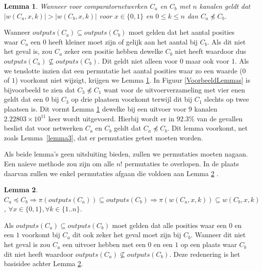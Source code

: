 \documentclass{article}
\newtheorem{lemma}{Lemma}
\begin{document}
\begin{lemma}
	Wanneer voor comparatornetwerken $C_a$ en $C_b$ met $n$ kanalen geldt dat $|w\left(C_a, x, k\right)| > |w\left(C_b, x, k\right)|$ voor $x \in \{0,1\}$ en $0 \leq k \leq n$ dan $C_a \npreceq C_b$.
	\label{lemma4}
\end{lemma}
Wanneer ${outputs(C_a) \subseteq outputs(C_b)}$ moet gelden dat het aantal posities waar $C_a$ een $0$ heeft kleiner moet zijn of gelijk aan het aantal bij $C_b$.
Als dit niet het geval is, zou $C_a$ zeker een positie hebben dewelke $C_b$ niet heeft waardoor dus ${outputs(C_a) \nsubseteq outputs(C_b)}$.
Dit geldt niet alleen voor $0$ maar ook voor $1$.
Als we tenslotte inzien dat een permutatie het aantal posities waar zo een waarde ($0$ of $1$) voorkomt niet wijzigt, krijgen we Lemma \ref{lemma4}.
In Figuur \ref{VoorbeeldLemmas} is bijvoorbeeld te zien dat $C_3 \npreceq C_1$ want voor de uitvoerverzameling met vier enen geldt dat een $0$ bij $C_3$ op drie plaatsen voorkomt terwijl dit bij $C_1$ slechts op twee plaatsen is.
Dit vormt Lemma \ref{lemma4} dewelke bij een uitvoer voor $9$ kanalen ${2.22803 \times 10^{11}}$ keer wordt uitgevoerd. Hierbij wordt er in $92.3\%$ van de gevallen beslist dat voor netwerken $C_a$ en $C_b$ geldt dat $C_a \npreceq C_b$.
Dit lemma voorkomt, net zoals Lemma~\ref{lemma3}, dat er permutaties getest moeten worden.

Als beide lemma's geen uitsluiting bieden, zullen we permutaties moeten nagaan.
Een na\"ieve methode zou zijn om alle $n!$ permutaties te overlopen.
In de plaats daarvan zullen we enkel permutaties afgaan die voldoen aan Lemma \ref{lemma5} \cite{sortingNetworksSize2014}.
\begin{lemma}
	${C_a \preceq C_b  \Rightarrow \pi\left(outputs\left(C_{a}\right)\right) \subseteq outputs\left(C_{b}\right)} \Rightarrow \pi\left(w\left(C_a, x, k\right)\right) \subseteq w\left(C_b, x, k\right)$,
	${\forall x \in \{0,1\}, \forall k \in \{1..n\}}$.
\label{lemma5}
\end{lemma}

Als ${outputs(C_a) \subseteq outputs(C_b)}$ moet gelden dat alle posities waar een $0$ en een $1$ voorkomt bij $C_a$ dit ook zeker het geval moet zijn bij $C_b$.
Wanneer dit niet het geval is zou $C_a$ een uitvoer hebben met een $0$ en een $1$ op een plaats waar $C_b$ dit niet heeft waardoor ${outputs(C_a) \nsubseteq outputs(C_b)}$.
Deze redenering is het basisidee achter Lemma \ref{lemma5}.
\end{document}
